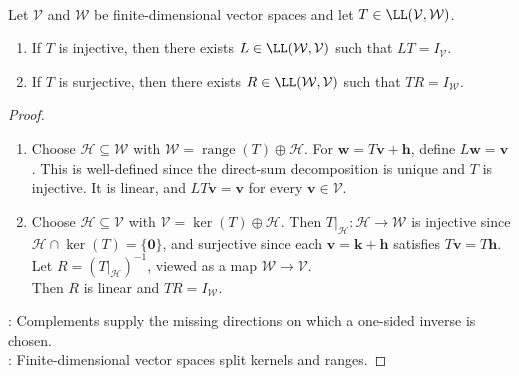 \begin{proposition} \label{prop:finite-dimensional-one-sided-inverses-split} \\
Let $\mathcal{V}$ and $\mathcal{W}$ be finite-dimensional vector spaces and let $T\in\LL(\mathcal{V},\mathcal{W})$.
\begin{enumerate}[label=(\roman*)]
\setlength{\itemsep}{0pt}
\item If $T$ is injective, then there exists $L\in\LL(\mathcal{W},\mathcal{V})$ such that $LT=I_{\mathcal{V}}$.
\item If $T$ is surjective, then there exists $R\in\LL(\mathcal{W},\mathcal{V})$ such that $TR=I_{\mathcal{W}}$.
\end{enumerate}
\begin{proof}
\begin{enumerate}[label=(\roman*)]
\setlength{\itemsep}{0pt}
\item Choose $\mathcal{H}\subseteq\mathcal{W}$ with $\mathcal{W}=\operatorname{range}(T)\oplus\mathcal{H}$. For $\mathbf{w}=T\mathbf{v}+\mathbf{h}$, define $L\mathbf{w}=\mathbf{v}$. This is well-defined since the direct-sum decomposition is unique and $T$ is injective. It is linear, and $LT\mathbf{v}=\mathbf{v}$ for every $\mathbf{v}\in\mathcal{V}$.
\item Choose $\mathcal{H}\subseteq\mathcal{V}$ with $\mathcal{V}=\ker(T)\oplus\mathcal{H}$. Then $T|_{\mathcal{H}}:\mathcal{H}\to\mathcal{W}$ is injective since $\mathcal{H}\cap\ker(T)=\{\mathbf{0}\}$, and surjective since each $\mathbf{v}=\mathbf{k}+\mathbf{h}$ satisfies $T\mathbf{v}=T\mathbf{h}$. Let $R=(T|_{\mathcal{H}})^{-1}$, viewed as a map $\mathcal{W}\to\mathcal{V}$.\\
Then $R$ is linear and $TR=I_{\mathcal{W}}$.
\end{enumerate}
: Complements supply the missing directions on which a one-sided inverse is chosen.\\
: Finite-dimensional vector spaces split kernels and ranges.
\end{proof}
\end{proposition}

